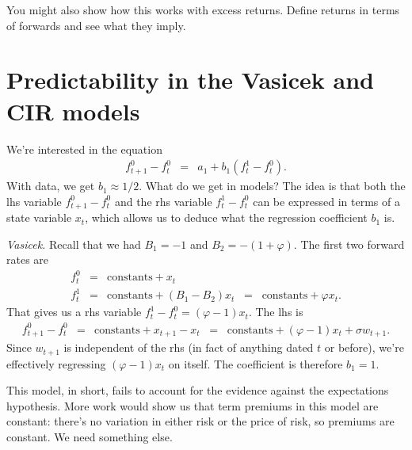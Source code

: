\documentclass[11pt]{article}
\begin{document}
You might also show how this works with excess returns.  Define returns
in terms of forwards and see what they imply.


\section{Predictability in the Vasicek and CIR models}

We're interested in the equation
\begin{eqnarray*}
    f^{0}_{t+1} - f^0_t &=& a_1 + b_1 (f^1_t - f^0_t) .
\end{eqnarray*}
With data, we get $b_1 \approx 1/2$.  What do we get in models?
The idea is that both the lhs variable $f^{0}_{t+1} - f^0_t$
and the rhs variable $f^1_t - f^0_t$ can be expressed in terms
of a state variable $x_t$, which allows us to deduce what the regression
coefficient $b_1$ is.

{\it Vasicek.\/}
Recall that we had $B_1 = -1$ and $B_2 = -(1+\varphi)$.
The first two forward rates are
\begin{eqnarray*}
    f^0_t &=& \mbox{constants} + x_t \\
    f^1_t &=& \mbox{constants} + (B_1-B_2) x_t
            \;\;=\;\; \mbox{constants} + \varphi x_t .
\end{eqnarray*}
That gives us a rhs variable $f^1_t - f^0_t = (\varphi-1)x_t$.
The lhs is
\begin{eqnarray*}
    f^0_{t+1} - f^0_t &=& \mbox{constants} + x_{t+1} - x_t
                    \;\;=\;\; \mbox{constants} + (\varphi-1) x_t + \sigma w_{t+1}.
\end{eqnarray*}
Since $w_{t+1}$ is independent of the rhs (in fact of anything dated $t$ or before),
we're effectively regressing $(\varphi-1) x_t$
on itself.
The coefficient is therefore $b_1 = 1$.

This model, in short, fails to account for the evidence against the expectations
hypothesis.
More work would show us that term premiums in this model are constant:
there's no variation in either risk or the price of risk,
so premiums are constant.
We need something else.
\end{document}
